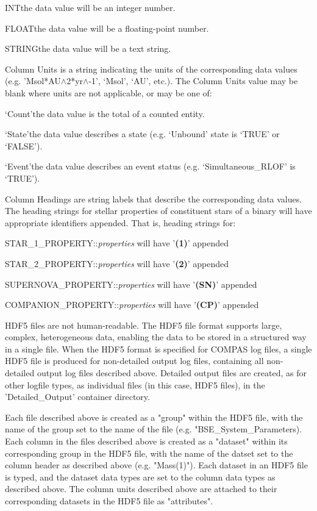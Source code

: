 \medskip
\medskip
\tabto{3em}INT\tabto{7.5em}the data value will be an integer number.

\tabto{3em}FLOAT\tabto{7.5em}the data value will be a floating-point number.

\tabto{3em}STRING\tabto{7.5em}the data value will be a text string.

\bigskip
Column Units is a string indicating the units of the corresponding data values (e.g. 'Msol*AU$\mathrm{\wedge}$2*yr$\mathrm{\wedge}$-1', `Msol', `AU', etc.).  The Column Units value may be blank where units are not applicable, or may be one of:

\tabto{3em}`Count'\tabto{7.5em}the data value is the total of a counted entity.

\tabto{3em}`State'\tabto{7.5em}the data value describes a state (e.g. `Unbound' state is `TRUE' or `FALSE').

\tabto{3em}`Event'\tabto{7.5em}the data value describes an event status (e.g. `Simultaneous\_RLOF' is `TRUE').

\bigskip
Column Headings are string labels that describe the corresponding data values. The heading strings for stellar properties of constituent stars of a binary will have appropriate identifiers appended. That is, heading strings for:

\hfill
\begin{minipage}{\dimexpr\textwidth-3em}
\medskip
STAR\_1\_PROPERTY::\textit{properties} will have '\textbf{(1)}' appended

\medskip
STAR\_2\_PROPERTY::\textit{properties} will have '\textbf{(2)}' appended

\medskip
SUPERNOVA\_PROPERTY::\textit{properties} will have '\textbf{(SN)}' appended

\medskip
COMPANION\_PROPERTY::\textit{properties} will have '\textbf{(CP)}' appended
\end{minipage}

\bigskip
\ac{HDF5} files are not human-readable. The \ac{HDF5} file format supports large, complex, heterogeneous data, enabling the data to be stored in a structured way in a single file. When the \ac{HDF5} format is specified for COMPAS log files, a single \ac{HDF5} file is produced for non-detailed output log files, containing all non-detailed output log files described above. Detailed output files are created, as for other logfile types, as individual files (in this case, HDF5 files), in the 'Detailed\_Output' container directory.

Each file described above is created as a "group" within the \ac{HDF5} file, with the name of the group set to the name of the file (e.g. "BSE\_System\_Parameters). Each column in the files described above is created as a "dataset" within its corresponding group in the \ac{HDF5} file, with the name of the datset set to the column header as described above (e.g. "Mass(1)"). Each dataset in an \ac{HDF5} file is typed, and the dataset data types are set to the column data types as described above. The column units described above are attached to their corresponding datasets in the \ac{HDF5} file as "attributes".


